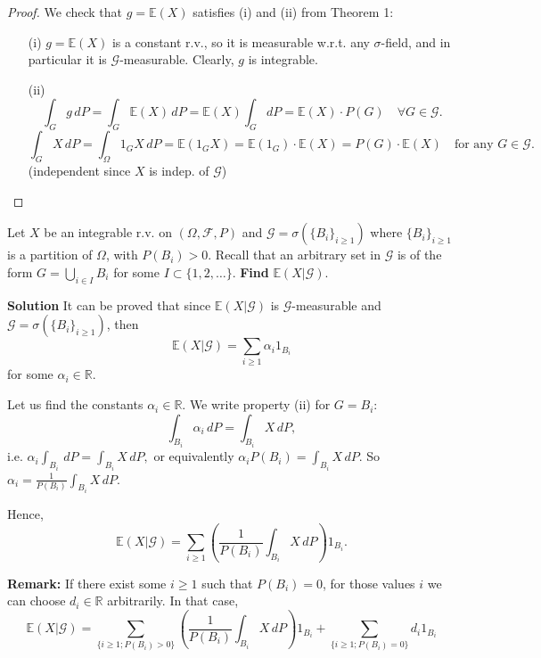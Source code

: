 \begin{proof}
    We check that \(g = \mathbb{E}(X)\) satisfies (i) and (ii) from Theorem 1:
\begin{itemize}
    \item[(i)] \(g = \mathbb{E}(X)\) is a constant r.v., so it is measurable w.r.t. any \(\sigma\)-field, and in particular it is \(\mathcal{G}\)-measurable. Clearly, \(g\) is integrable.
    \item[(ii)] 
    \[
    \int_G g \, dP = \int_G \mathbb{E}(X) \, dP = \mathbb{E}(X) \int_G dP = \mathbb{E}(X) \cdot P(G) \quad \forall G \in \mathcal{G}.
    \]
    \[
    \int_G X \, dP = \int_\Omega 1_G X \, dP = \mathbb{E}(1_G X) = \mathbb{E}(1_G) \cdot \mathbb{E}(X) = P(G) \cdot \mathbb{E}(X) \quad \text{for any } G \in \mathcal{G}.
    \]
    (independent since \(X\) is indep. of \(\mathcal{G}\))
\end{itemize}
\end{proof}
\begin{example}
Let \( X \) be an integrable r.v. on \( (\Omega, \mathcal{F}, P) \) and \(\mathcal{G} = \sigma(\{ B_i \}_{i \geq 1}) \) where \( \{ B_i \}_{i \geq 1} \) is a partition of \(\Omega\), with \( P(B_i) > 0 \). Recall that an arbitrary set in \(\mathcal{G}\) is of the form \( G = \bigcup_{i \in I} B_i \) for some \( I \subset \{ 1, 2, \ldots \} \).
\textbf{Find} \( \mathbb{E}(X|\mathcal{G}) \).

\textbf{Solution}
It can be proved that since \( \mathbb{E}(X|\mathcal{G}) \) is \(\mathcal{G}\)-measurable and \( \mathcal{G} = \sigma(\{ B_i \}_{i \geq 1}) \), then 
\[ \mathbb{E}(X|\mathcal{G}) = \sum_{i \geq 1} \alpha_i 1_{B_i} \]
for some \( \alpha_i \in \mathbb{R} \).

Let us find the constants \( \alpha_i \in \mathbb{R} \). We write property (ii) for \( G = B_i \):
\[ \int_{B_i} \alpha_i \, dP = \int_{B_i} X \, dP, \]
i.e. \( \alpha_i \int_{B_i} \, dP = \int_{B_i} X \, dP, \)
or equivalently \( \alpha_i P(B_i) = \int_{B_i} X \, dP \). So \( \alpha_i = \frac{1}{P(B_i)} \int_{B_i} X \, dP \).

Hence,
\[ \mathbb{E}(X|\mathcal{G}) = \sum_{i \geq 1} \left( \frac{1}{P(B_i)} \int_{B_i} X \, dP \right) 1_{B_i}. \]

\end{example}

\textbf{Remark:} If there exist some \( i \geq 1 \) such that \( P(B_i) = 0 \), for those values \( i \) we can choose \( d_i \in \mathbb{R} \) arbitrarily. In that case,
\[ \mathbb{E}(X|\mathcal{G}) = \sum_{\{i \geq 1; P(B_i) > 0\}} \left( \frac{1}{P(B_i)} \int_{B_i} X \, dP \right) 1_{B_i} + \sum_{\{i \geq 1; P(B_i) = 0\}} d_i 1_{B_i} \]

